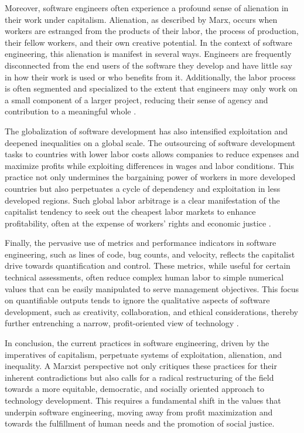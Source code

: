\begin{refsection}
Moreover, software engineers often experience a profound sense of alienation in their work under capitalism. Alienation, as described by Marx, occurs when workers are estranged from the products of their labor, the process of production, their fellow workers, and their own creative potential. In the context of software engineering, this alienation is manifest in several ways. Engineers are frequently disconnected from the end users of the software they develop and have little say in how their work is used or who benefits from it. Additionally, the labor process is often segmented and specialized to the extent that engineers may only work on a small component of a larger project, reducing their sense of agency and contribution to a meaningful whole \cite[pp.~85-87]{marxEconomic2018}.

The globalization of software development has also intensified exploitation and deepened inequalities on a global scale. The outsourcing of software development tasks to countries with lower labor costs allows companies to reduce expenses and maximize profits while exploiting differences in wages and labor conditions. This practice not only undermines the bargaining power of workers in more developed countries but also perpetuates a cycle of dependency and exploitation in less developed regions. Such global labor arbitrage is a clear manifestation of the capitalist tendency to seek out the cheapest labor markets to enhance profitability, often at the expense of workers' rights and economic justice \cite[pp.~104-107]{harveyBriefHistory2007}.

Finally, the pervasive use of metrics and performance indicators in software engineering, such as lines of code, bug counts, and velocity, reflects the capitalist drive towards quantification and control. These metrics, while useful for certain technical assessments, often reduce complex human labor to simple numerical values that can be easily manipulated to serve management objectives. This focus on quantifiable outputs tends to ignore the qualitative aspects of software development, such as creativity, collaboration, and ethical considerations, thereby further entrenching a narrow, profit-oriented view of technology \cite[pp.~145-149]{huwsLabor2019}.

In conclusion, the current practices in software engineering, driven by the imperatives of capitalism, perpetuate systems of exploitation, alienation, and inequality. A Marxist perspective not only critiques these practices for their inherent contradictions but also calls for a radical restructuring of the field towards a more equitable, democratic, and socially oriented approach to technology development. This requires a fundamental shift in the values that underpin software engineering, moving away from profit maximization and towards the fulfillment of human needs and the promotion of social justice.


\end{refsection}
